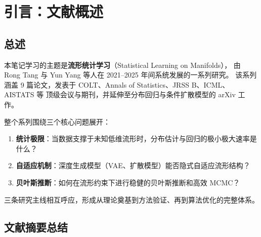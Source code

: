 
\chapter*{引言：文献概述}
\label{chap:Introduction}

\section{总述}

本笔记学习的主题是\textbf{流形统计学习}（Statistical Learning on Manifolds），
由 Rong Tang 与 Yun Yang 等人在 2021--2025 年间系统发展的一系列研究。
该系列涵盖 9 篇论文，发表于 COLT、Annals of Statistics、JRSS B、ICML、AISTATS 等
顶级会议与期刊，并延伸至分布回归与条件扩散模型的 arXiv 工作。

整个系列围绕三个核心问题展开：
\begin{enumerate}
    \item \textbf{统计极限}：当数据支撑于未知低维流形时，分布估计与回归的极小极大速率是什么？
    \item \textbf{自适应机制}：深度生成模型（VAE、扩散模型）能否隐式自适应流形结构？
    \item \textbf{贝叶斯推断}：如何在流形约束下进行稳健的贝叶斯推断和高效 MCMC？
\end{enumerate}

三条研究主线相互呼应，形成从理论奠基到方法验证、再到算法优化的完整体系。

\section{文献摘要总结}\label{sec:LiteratureSummary}

